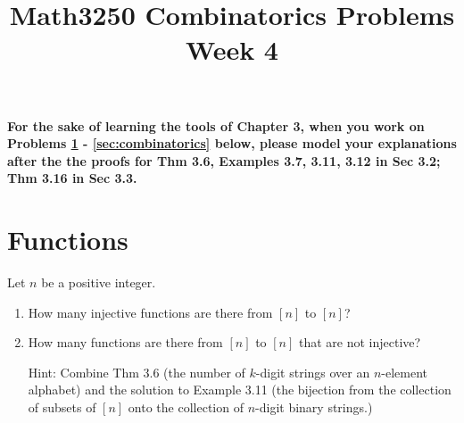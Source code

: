 \documentclass[12pt]{amsart}
\title{Math3250 Combinatorics Problems Week 4}
\date{}
\begin{document}
\maketitle




\noindent \textbf{
For the sake of learning the tools of Chapter 3, when you work on Problems \ref{sec:functions} - \ref{sec:combinatorics} below, please model your explanations after the the proofs for Thm 3.6, Examples 3.7, 3.11, 3.12 in Sec 3.2; Thm 3.16 in Sec 3.3. }





\section{Functions}\label{sec:functions}
Let $n$ be a positive integer.
\begin{enumerate}
\item How many injective functions are there from $[n]$ to $[n]$? 

\item How many functions are there from $[n]$ to $[n]$ that are not injective?

\noindent
{\tiny  Hint:
Combine Thm 3.6 (the number of $k$-digit strings over an $n$-element alphabet) and the solution to Example 3.11 (the bijection from the collection of subsets of $[n]$ onto the collection of $n$-digit binary strings.)}
\end{enumerate}
\end{document}
